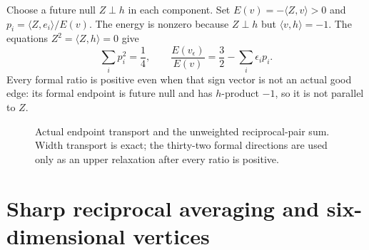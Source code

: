 \documentclass[11pt]{article}
\theoremstyle{remark}
\newcommand{\ip}[2]{\langle #1,#2\rangle}
\begin{document}
Choose a future null $Z\perp h$ in each component. Set
$E(v)=-\ip{Z}{v}>0$ and $p_i=\ip{Z}{e_i}/E(v)$.
The energy is nonzero because $Z\perp h$ but $\ip{v}{h}=-1$.
The equations $Z^2=\ip{Z}{h}=0$ give
\begin{equation}\label{eq:ratio}
 \sum_i p_i^2=\frac14,\qquad
 \frac{E(v_\epsilon)}{E(v)}=\frac32-\sum_i\epsilon_i p_i.
\end{equation}
Every formal ratio is positive even when that sign vector is not an
actual good edge: its formal endpoint is future null and has $h$-product
$-1$, so it is not parallel to $Z$.

\begin{figure}[tb]
\centering
{}
\caption{Actual endpoint transport and the unweighted reciprocal-pair
sum. Width transport is exact; the thirty-two formal directions are
used only as an upper relaxation after every ratio is positive.}
\label{fig:transport}
\end{figure}

\section{Sharp reciprocal averaging and six-dimensional vertices}\label{sec:reciprocal}
\end{document}
